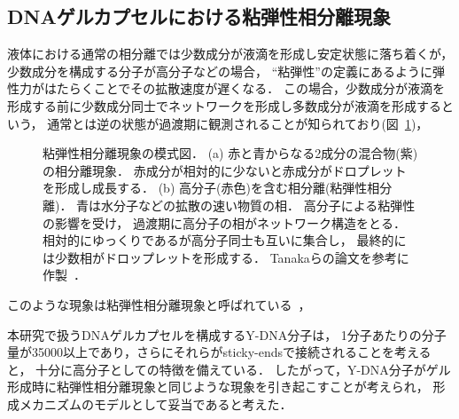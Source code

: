 \subsection{DNAゲルカプセルにおける粘弾性相分離現象}
液体における通常の相分離では少数成分が液滴を形成し安定状態に落ち着くが，
少数成分を構成する分子が高分子などの場合，
``粘弾性''の定義にあるように弾性力がはたらくことでその拡散速度が遅くなる．
この場合，少数成分が液滴を形成する前に少数成分同士でネットワークを形成し多数成分が液滴を形成するという，
通常とは逆の状態が過渡期に観測されることが知られており(図~\ref{fig:veps})，
\begin{figure}
    \centering
    
    \caption{
        粘弾性相分離現象の模式図．
        (a) 赤と青からなる2成分の混合物(紫)の相分離現象．
            赤成分が相対的に少ないと赤成分がドロプレットを形成し成長する．
        (b) 高分子(赤色)を含む相分離(粘弾性相分離)．
            青は水分子などの拡散の速い物質の相．
            高分子による粘弾性の影響を受け，
            過渡期に高分子の相がネットワーク構造をとる．
            相対的にゆっくりであるが高分子同士も互いに集合し，
            最終的には少数相がドロップレットを形成する．
        Tanakaらの論文を参考に作製~\cite{tanaka2009formation}．
    }
    \label{fig:veps}
\end{figure}
このような現象は粘弾性相分離現象と呼ばれている~\cite{tanaka2009formation}，

本研究で扱うDNAゲルカプセルを構成するY-DNA分子は，
1分子あたりの分子量が35000以上であり，さらにそれらがsticky-endsで接続されることを考えると，
十分に高分子としての特徴を備えている．
したがって，Y-DNA分子がゲル形成時に粘弾性相分離現象と同じような現象を引き起こすことが考えられ，
形成メカニズムのモデルとして妥当であると考えた．

